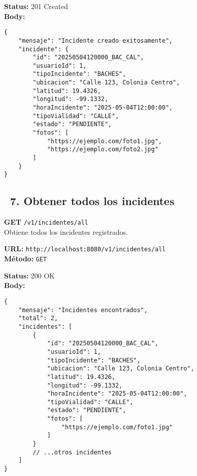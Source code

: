 \begin{tcolorbox}[response]
    \textbf{Status:} 201 Created\\
    \textbf{Body:}
    \begin{verbatim}
{
    "mensaje": "Incidente creado exitosamente",
    "incidente": {
        "id": "20250504120000_BAC_CAL",
        "usuarioId": 1,
        "tipoIncidente": "BACHES",
        "ubicacion": "Calle 123, Colonia Centro",
        "latitud": 19.4326,
        "longitud": -99.1332,
        "horaIncidente": "2025-05-04T12:00:00",
        "tipoVialidad": "CALLE",
        "estado": "PENDIENTE",
        "fotos": [
            "https://ejemplo.com/foto1.jpg",
            "https://ejemplo.com/foto2.jpg"
        ]
    }
}
    \end{verbatim}
\end{tcolorbox}

\subsection*{\faServer\ 7. Obtener todos los incidentes}
\begin{tcolorbox}[endpoint]
    \textbf{GET} \texttt{/v1/incidentes/all}\\
    Obtiene todos los incidentes registrados.
\end{tcolorbox}

\begin{tcolorbox}[request]
    \textbf{URL:} \textcolor{urlColor}{\texttt{http://localhost:8080/v1/incidentes/all}}\\
    \textbf{Método:} \textcolor{methodColor}{\texttt{GET}}
\end{tcolorbox}

\begin{tcolorbox}[response]
    \textbf{Status:} 200 OK\\
    \textbf{Body:}
    \begin{verbatim}
{
    "mensaje": "Incidentes encontrados",
    "total": 2,
    "incidentes": [
        {
            "id": "20250504120000_BAC_CAL",
            "usuarioId": 1,
            "tipoIncidente": "BACHES",
            "ubicacion": "Calle 123, Colonia Centro",
            "latitud": 19.4326,
            "longitud": -99.1332,
            "horaIncidente": "2025-05-04T12:00:00",
            "tipoVialidad": "CALLE",
            "estado": "PENDIENTE",
            "fotos": [
                "https://ejemplo.com/foto1.jpg"
            ]
        }
        // ...otros incidentes
    ]
}
    \end{verbatim}
\end{tcolorbox}

